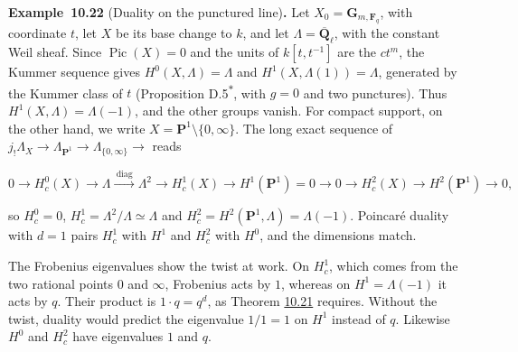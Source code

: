 \documentclass[11pt]{article}
\newenvironment{bpstatement}[2]{\par\addvspace{0.6\baselineskip}\noindent\textbf{#1}#2\textbf{.}\enspace\ignorespaces}
  {\par\addvspace{0.4\baselineskip}}
\newcommand{\bpout}[1]{#1\textsuperscript{\hyperlink{bp-outside}{\ensuremath{\ast}}}}
\begin{document}
\label{bp68}%
\begin{bpstatement}{Example~10.22}{ (Duality on the punctured line)}
Let \(X_0=\mathbf G_{m,\mathbf F_q}\), with coordinate \(t\), let \(X\) be its base change to \(k\), and let \(\Lambda=\overline{\mathbf Q}_\ell\), with the constant Weil sheaf. Since \(\operatorname{Pic}(X)=0\) and the units of \(k[t,t^{-1}]\) are the \(ct^m\), the Kummer sequence gives \(H^0(X,\Lambda)=\Lambda\) and \(H^1(X,\Lambda(1))=\Lambda\), generated by the Kummer class of \(t\) (Proposition \bpout{D.5}, with \(g=0\) and two punctures). Thus \(H^1(X,\Lambda)=\Lambda(-1)\), and the other groups vanish. For compact support, on the other hand, we write \(X=\mathbf P^1\setminus\{0,\infty\}\). The long exact sequence of \(j_!\Lambda_X\to\Lambda_{\mathbf P^1}\to\Lambda_{\{0,\infty\}}\to\) reads

\[
0\to H^0_c(X)\to\Lambda\xrightarrow{\ \text{diag}\ }\Lambda^2\to H^1_c(X)
\to H^1(\mathbf P^1)=0\to0\to H^2_c(X)\to H^2(\mathbf P^1)\to0,
\]

so \(H^0_c=0\), \(H^1_c=\Lambda^2/\Lambda\simeq\Lambda\) and \(H^2_c=H^2(\mathbf P^1,\Lambda)=\Lambda(-1)\). Poincaré duality with \(d=1\) pairs \(H^1_c\) with \(H^1\) and \(H^2_c\) with \(H^0\), and the dimensions match.

The Frobenius eigenvalues show the twist at work. On \(H^1_c\), which comes from the two rational points \(0\) and \(\infty\), Frobenius acts by \(1\), whereas on \(H^1=\Lambda(-1)\) it acts by \(q\). Their product is \(1\cdot q=q^d\), as Theorem \hyperref[bp65]{10.21} requires. Without the twist, duality would predict the eigenvalue \(1/1=1\) on \(H^1\) instead of \(q\). Likewise \(H^0\) and \(H^2_c\) have eigenvalues \(1\) and \(q\).
\end{bpstatement}
\end{document}
